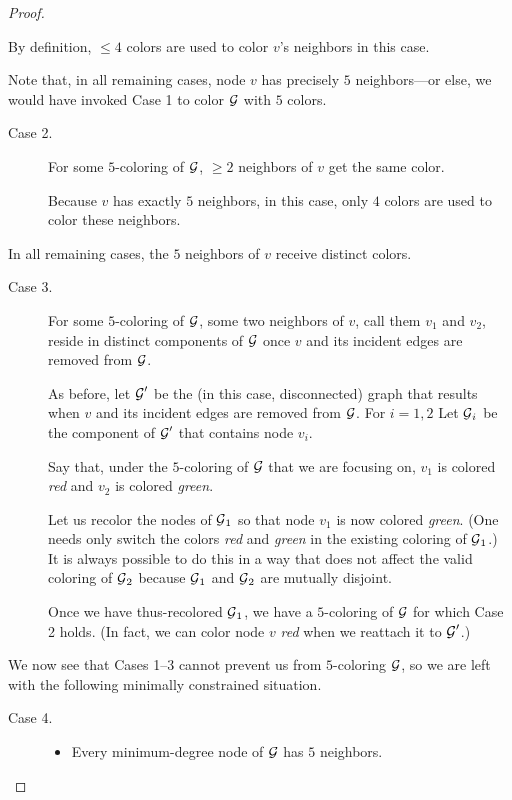 {\begin{proof}
\begin{description}
\smallskip

By definition, $\leq 4$ colors are used to color $v$'s neighbors in
this case.
\end{description}
Note that, in all remaining cases, node $v$ has precisely $5$
neighbors---or else, we would have invoked Case 1 to color $\mbox{$\cal G$}$ with
$5$ colors.
\begin{description}
\item[{\sf Case 2}.]
For some $5$-coloring of $\mbox{$\cal G$}$, $\geq 2$ neighbors of $v$ get the same
color.

\smallskip

Because $v$ has exactly $5$ neighbors, in this case, only $4$ colors
are used to color these neighbors.
\end{description}
In all remaining cases, the $5$ neighbors of $v$ receive distinct
colors.
\begin{description}
\item[{\sf Case 3}.]
For some $5$-coloring of $\mbox{$\cal G$}$, some two neighbors of $v$, call them
$v_1$ and $v_2$, reside in distinct components of $\mbox{$\cal G$}$ once $v$ and
its incident edges are removed from $\mbox{$\cal G$}$.

\smallskip

As before, let $\mbox{$\cal G$}'$ be the (in this case, disconnected) graph that
results when $v$ and its incident edges are removed from $\mbox{$\cal G$}$.  For $i
= 1,2$ Let $\mbox{$\cal G$}_i$ be the component of $\mbox{$\cal G$}'$ that contains node $v_i$.

Say that, under the $5$-coloring of $\mbox{$\cal G$}$ that we are focusing on,
$v_1$ is colored {\it red} and $v_2$ is colored {\it green}.

Let us recolor the nodes of $\mbox{$\cal G$}_1$ so that node $v_1$ is now colored
{\it green}.  (One needs only switch the colors {\it red} and {\it
  green} in the existing coloring of $\mbox{$\cal G$}_1$.)  It is always possible
to do this in a way that does not affect the valid coloring of $\mbox{$\cal G$}_2$
because $\mbox{$\cal G$}_1$ and $\mbox{$\cal G$}_2$ are mutually disjoint.

Once we have thus-recolored $\mbox{$\cal G$}_1$, we have a $5$-coloring of $\mbox{$\cal G$}$ for
which Case 2 holds.  (In fact, we can color node $v$ {\em red} when we
reattach it to $\mbox{$\cal G$}'$.)
\end{description}

\noindent
We now see that Cases 1--3 cannot prevent us from $5$-coloring $\mbox{$\cal G$}$, so
we are left with the following minimally constrained situation.
\begin{description}
\item[{\sf Case 4}.]
\begin{itemize}
\item
Every minimum-degree node of $\mbox{$\cal G$}$ has $5$ neighbors.


\end{itemize}
\end{description}
\end{proof}}
